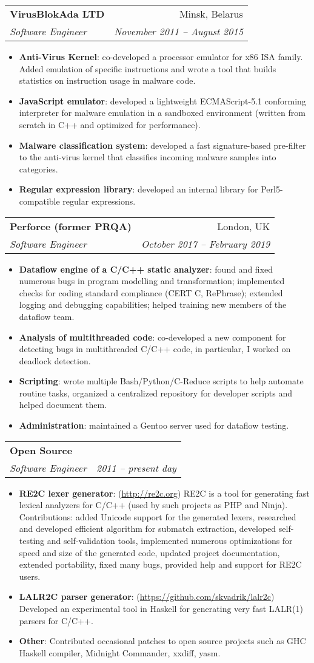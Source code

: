 \documentclass[letterpaper,11pt]{article}
\makeatletter
\newcommand{\resumeItem}[2]{
  \item\small{
    \textbf{#1}{: #2 \vspace{-2pt}}
  }
}
\newcommand{\resumeSubheading}[4]{
  \vspace{-1pt}\item[]
    \begin{tabular*}{0.97\textwidth}{l@{\extracolsep{\fill}}r}
      \textbf{#1} & #2 \\
      \textit{\small#3} & \textit{\small #4} \\
    \end{tabular*}\vspace{-5pt}
}
\newcommand{\resumeItemListStart}{\begin{itemize}}
\newcommand{\resumeItemListEnd}{\end{itemize}\vspace{-5pt}}
\makeatother
\begin{document}
    \resumeSubheading
      {VirusBlokAda LTD}{Minsk, Belarus}
      {Software Engineer}{November 2011 -- August 2015}
      \resumeItemListStart
        \resumeItem{Anti-Virus Kernel}
          {co-developed a processor emulator for x86 ISA family.
          Added emulation of specific instructions
          and wrote a tool that builds statistics on instruction usage in malware code.}
        \resumeItem{JavaScript emulator}
          {developed a lightweight ECMAScript-5.1 conforming interpreter for malware emulation in a sandboxed environment
          (written from scratch in C++ and optimized for performance).}
        \resumeItem{Malware classification system}
          {developed a fast signature-based pre-filter to the anti-virus kernel
          that classifies incoming malware samples into categories.}
        \resumeItem{Regular expression library}
          {developed an internal library for Perl5-compatible regular expressions.}
      \resumeItemListEnd

    \resumeSubheading
      {Perforce (former PRQA)}{London, UK}
      {Software Engineer}{October 2017 -- February 2019}
      \resumeItemListStart
        \resumeItem{Dataflow engine of a C/C++ static analyzer}
          {found and fixed numerous bugs in program modelling and transformation;
          implemented checks for coding standard compliance (CERT C, RePhrase);
          extended logging and debugging capabilities;
          helped training new members of the dataflow team.}
        \resumeItem{Analysis of multithreaded code}
          {co-developed a new component for detecting bugs in multithreaded C/C++ code,
          in particular, I worked on deadlock detection.}
        \resumeItem{Scripting}
          {wrote multiple Bash/Python/C-Reduce scripts to help automate routine tasks,
          organized a centralized repository for developer scripts and helped document them.}
        \resumeItem{Administration}
          {maintained a Gentoo server used for dataflow testing.}
      \resumeItemListEnd

    \resumeSubheading
      {Open Source}{}
      {Software Engineer}{2011 -- present day}
      \resumeItemListStart
        \resumeItem{RE2C lexer generator}
          {(\url{http://re2c.org})
          RE2C is a tool for generating fast lexical analyzers for C/C++
          (used by such projects as PHP and Ninja).
          Contributions:
          added Unicode support for the generated lexers,
          researched and developed efficient algorithm for submatch extraction,
          developed self-testing and self-validation tools,
          implemented numerous optimizations for speed and size of the generated code,
          updated project documentation,
          extended portability,
          fixed many bugs,
          provided help and support for RE2C users.
          }
        \resumeItem{LALR2C parser generator}
          {(\url{https://github.com/skvadrik/lalr2c})
          Developed an experimental tool in Haskell for generating very fast LALR(1) parsers for C/C++.}
        \resumeItem{Other}
          {Contributed occasional patches to open source projects such as GHC Haskell compiler, Midnight Commander, xxdiff, yasm.}
      \resumeItemListEnd
\end{document}

